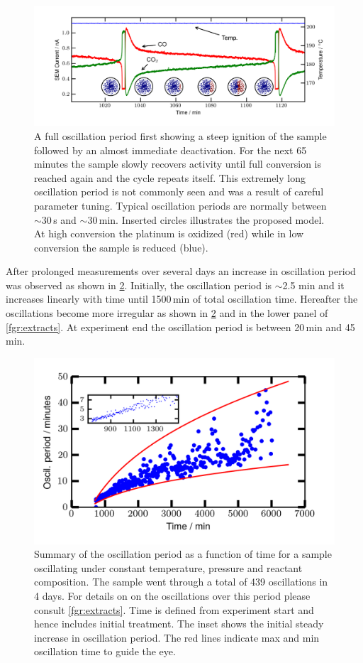 \documentclass[journal=jacsat,manuscript=article]{achemso}
\begin{document}
\begin{figure}
  \includegraphics[width=16cm]{single_full_oscillation.png}
  \caption{A full oscillation period first showing a steep ignition of the
  sample followed by an almost immediate deactivation. For the next 65 minutes
  the sample slowly recovers activity until full conversion is reached again
  and the cycle repeats itself. This extremely long oscillation period is not
  commonly seen and was a result of careful parameter tuning. Typical
  oscillation periods are normally between $\sim$30\,s and $\sim$30\,min.
  Inserted circles illustrates the proposed model. At high conversion the
  platinum is oxidized (red) while in low conversion the sample is reduced
  (blue).} \label{fgr:full_oscillation}
\end{figure}

After prolonged measurements over several days an increase in oscillation
period was observed as shown in \ref{fgr:long_measurement}. Initially, the
oscillation period is $\sim$2.5 min and it increases linearly with time until 1500\,min
of total oscillation time. Hereafter the oscillations become more irregular
as shown in \ref{fgr:long_measurement} and in the lower panel of \ref{fgr:extracts}. At
experiment end the oscillation period is between 20\,min and 45\,min.

\begin{figure}
  \includegraphics[width=12cm]{summary_of_long_measurement.png}
  \caption{Summary of the oscillation period as a function of time for a sample
  oscillating under constant temperature, pressure and reactant composition.
  The sample went through a total of 439 oscillations in 4 days. For details on on
  the oscillations over this period please consult \ref{fgr:extracts}. Time is
  defined from experiment start and hence includes initial treatment. The inset
  shows the initial steady increase in oscillation period. The red lines indicate
  max and min oscillation time to guide the eye.}
  \label{fgr:long_measurement}
\end{figure}
  
\end{document}
